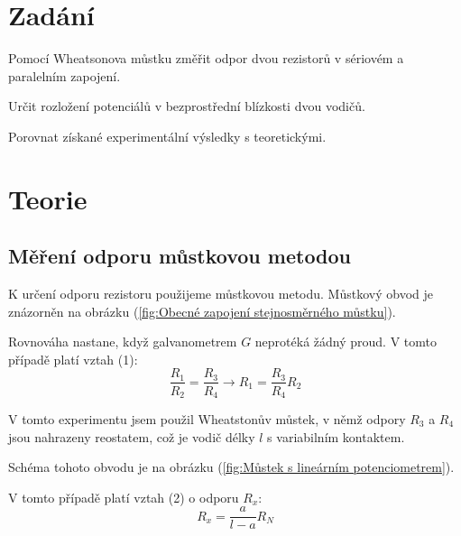 \documentclass[a4paper,11pt]{article}
\begin{document}
\section{Zadání}
    Pomocí Wheatsonova můstku změřit odpor dvou rezistorů v sériovém a paralelním zapojení.
    \par Určit rozložení potenciálů v bezprostřední blízkosti dvou vodičů. 
    \par Porovnat získané experimentální výsledky s teoretickými. 
    \vspace{30pt}
\par \begin{minipage}[]{0.5\textwidth}
    \section{Teorie}
    \subsection{Měření odporu můstkovou metodou}
        K určení odporu rezistoru použijeme můstkovou metodu. Můstkový obvod je znázorněn na obrázku (\ref{fig:Obecné zapojení stejnosměrného můstku}).
        \par Rovnováha nastane, když galvanometrem $G$ neprotéká žádný proud. V tomto případě platí vztah (1):
        \vspace{20pt}
        \begin{equation}
            \frac{R_1}{R_2} = \frac{R_3}{R_4} \longrightarrow R_1 = \frac{R_3}{R_4} R_2
        \end{equation}
        \vspace{20pt}
        \par V tomto experimentu jsem použil Wheatstonův můstek, v němž odpory $R_3$ a $R_4$ jsou
        nahrazeny reostatem, což je vodič délky $l$ s variabilním kontaktem. 
        \par Schéma tohoto obvodu je na obrázku (\ref{fig:Můstek s lineárním potenciometrem}). 
        \par V tomto případě platí vztah (2) o odporu $R_x$: 
        \begin{equation}
            R_x = \frac{a}{l-a} R_N
        \end{equation}
\end{minipage}
\hspace{10pt}
\end{document}
